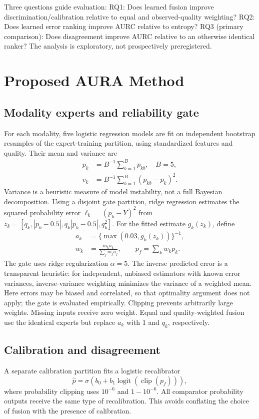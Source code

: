 \documentclass[conference]{IEEEtran}
\begin{document}
Three questions guide evaluation: RQ1: Does learned fusion improve discrimination/calibration relative to equal and observed-quality weighting? RQ2: Does learned error ranking improve AURC relative to entropy? RQ3 (primary comparison): Does disagreement improve AURC relative to an otherwise identical ranker? The analysis is exploratory, not prospectively preregistered.
\section{Proposed AURA Method}
\subsection{Modality experts and reliability gate}
For each modality, five logistic regression models are fit on independent bootstrap resamples of the expert-training partition, using standardized features and quality. Their mean and variance are
\begin{align}
p_k &= B^{-1}\sum_{b=1}^{B}p_{kb},\quad B=5,\\
v_k &= B^{-1}\sum_{b=1}^{B}(p_{kb}-p_k)^2.
\end{align}
Variance is a heuristic measure of model instability, not a full Bayesian decomposition. Using a disjoint gate partition, ridge regression estimates the squared probability error $\ell_k=(p_k-Y)^2$ from $z_k=[q_k,|p_k-0.5|,q_k|p_k-0.5|,q_k^2]$. For the fitted estimate $g_k(z_k)$, define
\begin{align}
a_k&=\{\max(0.03,g_k(z_k))\}^{-1},\\
w_k&=\frac{m_ka_k}{\sum_j m_ja_j},\qquad p_f=\sum_kw_kp_k.
\end{align}
The gate uses ridge regularization $\alpha=5$. The inverse predicted error is a transparent heuristic: for independent, unbiased estimators with known error variances, inverse-variance weighting minimizes the variance of a weighted mean. Here errors may be biased and correlated, so that optimality argument does not apply; the gate is evaluated empirically. Clipping prevents arbitrarily large weights. Missing inputs receive zero weight. Equal and quality-weighted fusion use the identical experts but replace $a_k$ with 1 and $q_k$, respectively.
\subsection{Calibration and disagreement}
A separate calibration partition fits a logistic recalibrator
\begin{equation}
\hat p=\sigma(b_0+b_1\operatorname{logit}(\operatorname{clip}(p_f))),
\end{equation}
where probability clipping uses $10^{-6}$ and $1-10^{-6}$. All comparator probability outputs receive the same type of recalibration. This avoids conflating the choice of fusion with the presence of calibration.
\end{document}
